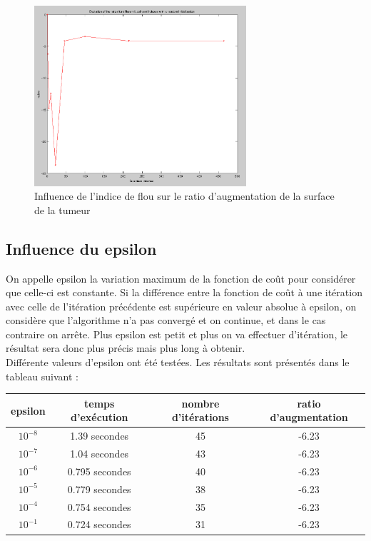 		\begin{figure}[H]
			\centering
			\includegraphics[width=0.7\textwidth]{images/2-flou.png}
			\caption{Influence de l'indice de flou sur le ratio d'augmentation de la surface de la tumeur}
			\label{fig:flou}
		\end{figure}

	\subsection{Influence du epsilon} %
	\label{ssub:influence_du_epsilon}
		On appelle epsilon la variation maximum de la fonction de coût pour considérer que celle-ci est constante. Si la différence entre la fonction de coût à une itération avec celle de l'itération précédente est supérieure en valeur absolue à epsilon, on considère que l'algorithme n'a pas convergé et on continue, et dans le cas contraire on arrête. Plus epsilon est petit et plus on va effectuer d'itération, le résultat sera donc plus précis mais plus long à obtenir.\\

		Différente valeurs d'epsilon ont été testées. Les résultats sont présentés dans le tableau suivant :\\

		\begin{tabular}{|c|c|c|c|}
			\hline
			epsilon & temps d’exécution & nombre d'itérations & ratio d'augmentation \\ \hline
			$10^{-8}$ & 1.39 secondes & 45 & -6.23 \\
			$10^{-7}$ & 1.04 secondes & 43 & -6.23 \\
			$10^{-6}$ & 0.795 secondes & 40 & -6.23 \\
			$10^{-5}$ & 0.779 secondes & 38 & -6.23 \\
			$10^{-4}$ & 0.754 secondes & 35 & -6.23 \\
			$10^{-1}$ & 0.724 secondes & 31 & -6.23 \\
			\hline
		\end{tabular}
		\bigskip

